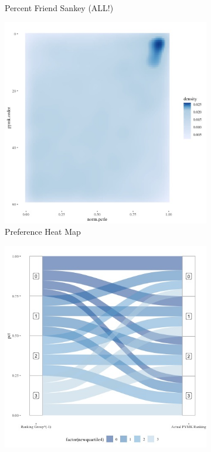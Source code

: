 \documentclass[12pt,letterpaper]{article}
\begin{document}
\begin{figure}[ht]
\begin{subfigure}{.5\textwidth}
        \caption{Percent Friend Sankey (ALL!)}
        \label{fig:pymkfriend_s}
    \end{subfigure}

   \begin{subfigure}{.5\textwidth} 
        \centering
        \includegraphics[width=1\linewidth]{Output/Graphs/Audit/Heatmaps/US PYMK norm pref rank by pymk rank - smooth.jpg}  
        \caption{Preference Heat Map}
        \label{fig:pymkpref_hm}
        \end{subfigure}
    \begin{subfigure}{.5\textwidth}
        \centering
        \includegraphics[width=1\linewidth]{Output/Graphs/Audit/Sankey flows/US PYMK norm quartile to actual.jpg}  

\end{subfigure}
\end{figure}
\end{document}
